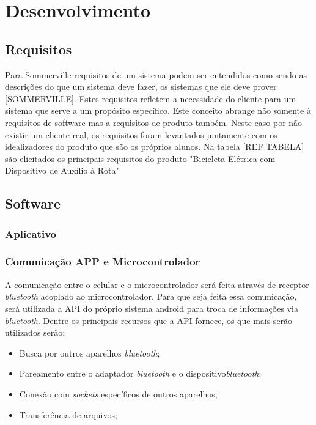 \chapter{Desenvolvimento}
  \section{Requisitos}
  Para Sommerville requisitos de um sistema podem ser entendidos como sendo as descrições do que um sistema deve fazer, os sistemas que ele deve prover [SOMMERVILLE]. Estes requisitos refletem a necessidade do cliente para um sistema que serve a um propósito específico. Este conceito abrange não somente à requisitos de software mas a requisitos de produto também. Neste caso por não existir um cliente real, os requisitos foram levantados juntamente com os idealizadores do produto que são os próprios alunos. 
  Na tabela [REF TABELA] são elicitados os principais requisitos do produto "Bicicleta Elétrica com Dispositivo de Auxílio à Rota"
  
  
  
  \section{Software}
	\subsection{Aplicativo}
	
	\subsection{Comunicação APP e Microcontrolador}
	  A comunicação entre o celular e o microcontrolador será feita através de receptor \textit{bluetooth} acoplado ao microcontrolador. Para que seja feita essa comunicação, será utilizada a API do próprio sistema android para troca de informações via \textit{bluetooth}. Dentre os principais recursos que a API fornece, os que mais serão utilizados serão:
	  \begin{itemize}
	  	\item Busca por outros aparelhos \textit{bluetooth};
	  	\item Pareamento entre o adaptador \textit{bluetooth} e o dispositivo\textit{bluetooth};
	  	\item Conexão com \textit{sockets} específicos de outros aparelhos;
	  	\item Transferência de arquivos;
	  \end{itemize}
	  
